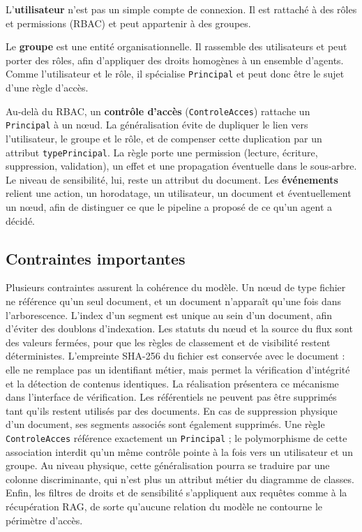 L'\textbf{utilisateur} n'est pas un simple compte de connexion. Il est rattaché à des rôles et permissions (RBAC) et peut appartenir à des groupes.

Le \textbf{groupe} est une entité organisationnelle. Il rassemble des utilisateurs et peut porter des rôles, afin d'appliquer des droits homogènes à un ensemble d'agents. Comme l'utilisateur et le rôle, il spécialise \texttt{Principal} et peut donc être le sujet d'une règle d'accès.

Au-delà du RBAC, un \textbf{contrôle d'accès} (\texttt{ControleAcces}) rattache un \texttt{Principal} à un nœud. La généralisation évite de dupliquer le lien vers l'utilisateur, le groupe et le rôle, et de compenser cette duplication par un attribut \texttt{typePrincipal}. La règle porte une permission (lecture, écriture, suppression, validation), un effet et une propagation éventuelle dans le sous-arbre. Le niveau de sensibilité, lui, reste un attribut du document. Les \textbf{événements} relient une action, un horodatage, un utilisateur, un document et éventuellement un nœud, afin de distinguer ce que le pipeline a proposé de ce qu'un agent a décidé.

\subsection{Contraintes importantes}

Plusieurs contraintes assurent la cohérence du modèle. Un nœud de type fichier ne référence qu'un seul document, et un document n'apparaît qu'une fois dans l'arborescence. L'index d'un segment est unique au sein d'un document, afin d'éviter des doublons d'indexation. Les statuts du nœud et la source du flux sont des valeurs fermées, pour que les règles de classement et de visibilité restent déterministes. L'empreinte SHA-256 du fichier est conservée avec le document : elle ne remplace pas un identifiant métier, mais permet la vérification d'intégrité et la détection de contenus identiques. La réalisation présentera ce mécanisme dans l'interface de vérification. Les référentiels ne peuvent pas être supprimés tant qu'ils restent utilisés par des documents. En cas de suppression physique d'un document, ses segments associés sont également supprimés. Une règle \texttt{ControleAcces} référence exactement un \texttt{Principal} ; le polymorphisme de cette association interdit qu'un même contrôle pointe à la fois vers un utilisateur et un groupe. Au niveau physique, cette généralisation pourra se traduire par une colonne discriminante, qui n'est plus un attribut métier du diagramme de classes. Enfin, les filtres de droits et de sensibilité s'appliquent aux requêtes comme à la récupération RAG, de sorte qu'aucune relation du modèle ne contourne le périmètre d'accès.

